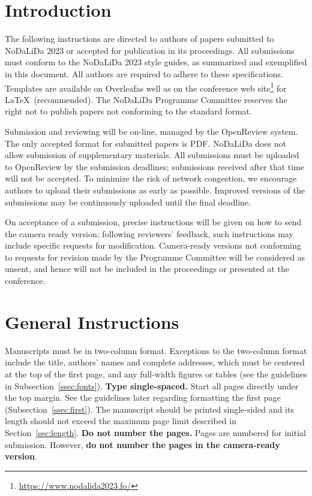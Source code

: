 \documentclass[11pt]{article}
\begin{document}
\section{Introduction}

The following instructions are directed to authors of papers submitted
to NoDaLiDa 2023 or accepted for publication in its proceedings. 
All submissions must conform to the NoDaLiDa 2023 style guides, as summarized
and exemplified in this document. All authors are required to adhere to these specifications. 
Templates are available on Overleaf\footnotemark[1] as well as on the conference web site\footnote{\url{https://www.nodalida2023.fo/}} for \LaTeX\
(recommended). The NoDaLiDa Programme Committee reserves
the right not to publish papers not conforming to the standard format. 

Submission and reviewing will be on-line, managed by the OpenReview system.
The only accepted format for submitted papers is PDF.
NoDaLiDa does not allow submission of supplementary materials.
All submissions must be uploaded to OpenReview by the submission deadlines;
submissions received after that time will not be accepted.
To minimize the risk of network congestion, we encourage authors to upload
their submissions as early as possible. 
Improved versions of the submissions may be continuously uploaded until the
final deadline. 

On acceptance of a submission, precise instructions will be given on how to
send the camera ready version; following reviewers' feedback, such instructions
may include specific requests for modification.
Camera-ready versions not conforming to requests for revision made by the
Programme Committee will be considered as unsent, and hence will not be
included in the proceedings or presented at the conference.

\section{General Instructions}

Manuscripts must be in two-column format.  Exceptions to the
two-column format include the title, authors' names and complete
addresses, which must be centered at the top of the first page, and
any full-width figures or tables (see the guidelines in
Subsection~\ref{ssec:fonts}). {\bf Type single-spaced.}  Start all
pages directly under the top margin. See the guidelines later
regarding formatting the first page (Subsection~\ref{ssec:first}).
The manuscript should be printed single-sided and its length should
not exceed the maximum page limit described in
Section~\ref{sec:length}.  {\bf Do not number the pages.}
Pages are numbered for  initial submission. However, {\bf do not number the pages in the camera-ready version}.
\end{document}
